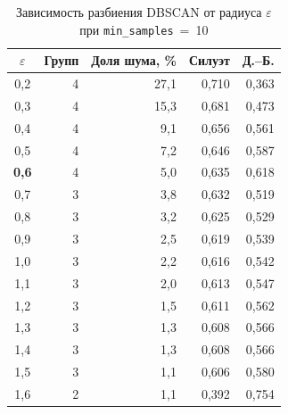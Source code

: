 \begin{table}[H]
\centering
\small
\caption{Зависимость разбиения DBSCAN от радиуса $\varepsilon$ при \texttt{min\_samples}~=~10}\label{tab:dbscan}
\begin{tabular}{crrrr}
\toprule
$\varepsilon$ & Групп & Доля шума, \% & Силуэт & Д.--Б. \\
\midrule
0,2 & 4 & 27,1 & 0,710 & 0,363 \\
0,3 & 4 & 15,3 & 0,681 & 0,473 \\
0,4 & 4 & 9,1 & 0,656 & 0,561 \\
0,5 & 4 & 7,2 & 0,646 & 0,587 \\
\textbf{0,6} & 4 & 5,0 & 0,635 & 0,618 \\
0,7 & 3 & 3,8 & 0,632 & 0,519 \\
0,8 & 3 & 3,2 & 0,625 & 0,529 \\
0,9 & 3 & 2,5 & 0,619 & 0,539 \\
1,0 & 3 & 2,2 & 0,616 & 0,542 \\
1,1 & 3 & 2,0 & 0,613 & 0,547 \\
1,2 & 3 & 1,5 & 0,611 & 0,562 \\
1,3 & 3 & 1,3 & 0,608 & 0,566 \\
1,4 & 3 & 1,3 & 0,608 & 0,566 \\
1,5 & 3 & 1,1 & 0,606 & 0,580 \\
1,6 & 2 & 1,1 & 0,392 & 0,754 \\
\bottomrule
\end{tabular}
\end{table}
